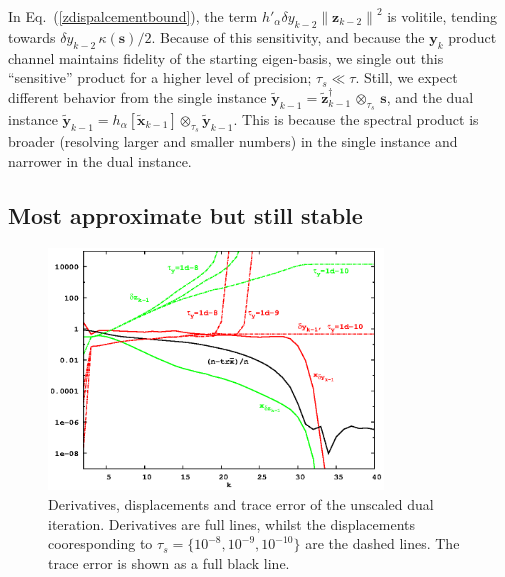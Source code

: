 \documentclass[letterpaper,twocolumn,amsmath,amsfont,amssymb,english,aps,jcp,preprintnumbers,groupaddress,nofootinbib,tightenlines,floatfix]{revtex4}
\newcommand{\mat}[1]{\boldsymbol{#1}}
\newcommand{\ots}{ {\scriptstyle \otimes}_{ \! \tau_s } }
\theoremstyle{plain}
\theoremstyle{remark}
\theoremstyle{plain}
\begin{document}
In Eq.~(\ref{zdispalcementbound}),  the term $h'_\alpha  \delta y_{k-2} { \lVert \mat{z}_{k-2} \rVert }^2$ is volitile, tending towards
$\delta y_{k-2} \, \kappa(\mat{s})/2$.  Because of this sensitivity, and because the $\mat{y}_k$ product channel maintains fidelity 
of the starting eigen-basis, we single out this ``sensitive'' product for a higher level of precision; $\tau_s \ll \tau$.
Still, we expect different behavior from the single instance $\widetilde{\mat{y}}_{k-1} = \widetilde{\mat{z}}^{\dagger}_{k-1} \, \ots \, \mat{s}$,
and the dual instance $\widetilde{\mat{y}}_{k-1} =  h_\alpha [\widetilde{\mat{x}}_{k-1}]  \ots \widetilde{\mat{y}}_{k-1} $.
This is because the spectral product is broader (resolving larger and smaller numbers) 
in the single instance and narrower in the dual instance.

\subsection{Most approximate but still stable}

\begin{figure}[h]
\includegraphics[width=3.5in]{fig_33_tube_cond_10_noscaling/33_nanotube_cond10_noscale_dual.eps}
\caption{Derivatives, displacements and trace error of the unscaled dual iteration.
Derivatives are full lines, whilst the displacements cooresponding to $\tau_s=\{10^{-8}, 10^{-9}, 10^{-10}\}$
are the dashed lines.  The trace error is shown as a full black line. } \label{flow_noscale_dual}
\end{figure}
\end{document}
